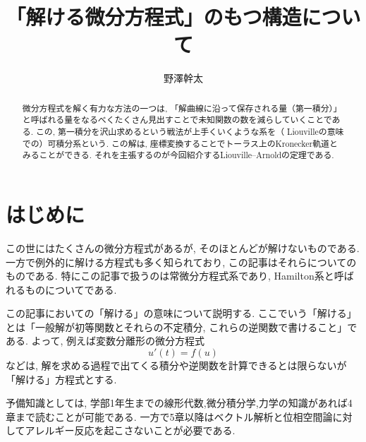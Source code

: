 \documentclass{ltjsarticle}
\theoremstyle{definition}
\numberwithin{thm}{section}
\theoremstyle{definition}
\numberwithin{prop}{section}
\theoremstyle{definition}
\numberwithin{dfn}{section}
\numberwithin{equation}{section}
\begin{document}
\title{「解ける微分方程式」のもつ構造について}
\author{野澤幹太}
\date{}
\maketitle  %

\begin{abstract}
    微分方程式を解く有力な方法の一つは, 「解曲線に沿って保存される量（第一積分）」と呼ばれる量をなるべくたくさん見出すことで未知関数の数を減らしていくことである.
    この, 第一積分を沢山求めるという戦法が上手くいくような系を（ Liouvilleの意味での）可積分系という. この解は, 座標変換することでトーラス上のKronecker軌道とみることができる. それを主張するのが今回紹介するLiouville--Arnoldの定理である.
\end{abstract}

\section{はじめに}
この世にはたくさんの微分方程式があるが, そのほとんどが解けないものである. 一方で例外的に解ける方程式も多く知られており, この記事はそれらについてのものである. 特にこの記事で扱うのは常微分方程式系であり, Hamilton系と呼ばれるものについてである.

この記事においての「解ける」の意味について説明する. ここでいう「解ける」とは「一般解が初等関数とそれらの不定積分, これらの逆関数で書けること」である. よって, 例えば変数分離形の微分方程式
\begin{equation*}
    u'(t)=f(u)
\end{equation*}
などは, 解を求める過程で出てくる積分や逆関数を計算できるとは限らないが「解ける」方程式とする.

予備知識としては, 学部1年生までの線形代数,微分積分学,力学の知識があれば4章まで読むことが可能である. 一方で5章以降はベクトル解析と位相空間論に対してアレルギー反応を起こさないことが必要である.
\end{document}
